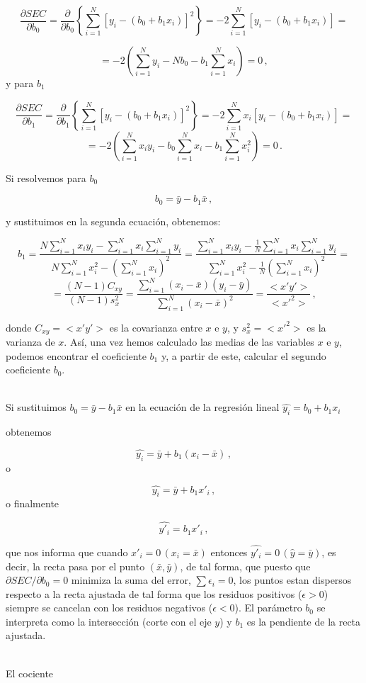 \documentclass[
]{agujournal2019}
\begin{document}
\[\frac{\partial{SEC}}{\partial{b_0}} =\frac{\partial}{\partial{b_0}}
  \left\{
    \sum^N_{i=1} [y_i - (b_0+b_1 x_i)]^2
  \right\}=
  -2\sum^N_{i=1} [y_i - (b_0+b_1 x_i)]=\]

\[=-2\left(\sum^N_{i=1}y_i -N b_0 - b_1\sum^N_{i=1} x_i  \right)=0\,,\]
y para \(b_1\)

\[\frac{\partial{SEC}}{\partial{b_1}} =\frac{\partial{}}{\partial{b_1}}
  \left\{
    \sum^N_{i=1} [y_i - (b_0+b_1 x_i)]^2
  \right\}=
  -2\sum^N_{i=1} x_i [y_i - (b_0+b_1 x_i)]=\]
\[=-2\left(\sum^N_{i=1}x_i y_i - b_0\sum^N_{i=1}x_i - b_1\sum^N_{i=1} x^2_i \right)=0\,.\]

Si resolvemos para \(b_0\)

\[b_0=\bar{y}-b_1\bar{x}\,,\]

y sustituimos en la segunda ecuación, obtenemos:

\[b_1=\frac{N \sum\limits^N_{i=1} x_i y_i - \sum\limits^N_{i=1}x_i \sum\limits^N_{i=1}y_i}
           {N\sum\limits^N_{i=1}x^2_i-\left(\sum\limits^N_{i=1}x_i \right)^2}=
      \frac{\sum\limits^N_{i=1} x_i y_i - \frac{1}{N}\sum\limits^N_{i=1}x_i \sum\limits^N_{i=1}y_i}
           {\sum\limits^N_{i=1}x^2_i-\frac{1}{N}\left(\sum\limits^N_{i=1}x_i \right)^2}=\]
\[=\frac{(N-1)C_{xy}}{(N-1)s^2_x}=\frac{\sum\limits^N_{i=1} (x_i-\bar{x})(y_i-\bar{y})}
{\sum\limits^N_{i=1} (x_i-\bar{x})^2}=\frac{<x'y'>}{<x'^2>}\,,\]

donde \(C_{xy}=<x'y'>\) es la covarianza entre \(x\) e \(y\), y
\(s^2_x=<x'^2>\) es la varianza de \(x\). Así, una vez hemos calculado
las medias de las variables \(x\) e \(y\), podemos encontrar el
coeficiente \(b_1\) y, a partir de este, calcular el segundo coeficiente
\(b_0\).\\
\strut \\
\noindent Si sustituimos \(b_0=\bar{y}-b_1\bar{x}\) en la ecuación de la
regresión lineal \(\hat{y_i}=b_0+b_1 x_i\)

obtenemos

\[\hat{y_i}=\bar{y} +b_1(x_i-\bar{x})\,,\] o

\[\hat{y_i}=\bar{y} +b_1{x'_i}\,,\] o finalmente

\[\hat{y'_i}=b_1{x'_i}\,,\]

que nos informa que cuando \(x'_i=0\,(x_i=\bar{x})\) entonces
\(\hat{y'_i}=0 \,(\hat{y}=\bar{y})\), es decir, la recta pasa por el
punto \((\bar{x},\bar{y})\), de tal forma, que puesto que
\(\partial{SEC}/{\partial{b_0}}=0\) minimiza la suma del error,
\(\sum \epsilon_i=0\), los puntos estan dispersos respecto a la recta
ajustada de tal forma que los residuos positivos (\(\epsilon>0\))
siempre se cancelan con los residuos negativos (\(\epsilon<0\)). El
parámetro \(b_0\) se interpreta como la intersección (corte con el eje
\(y\)) y \(b_1\) es la pendiente de la recta ajustada.\\
\strut \\
\noindent El cociente
\end{document}
